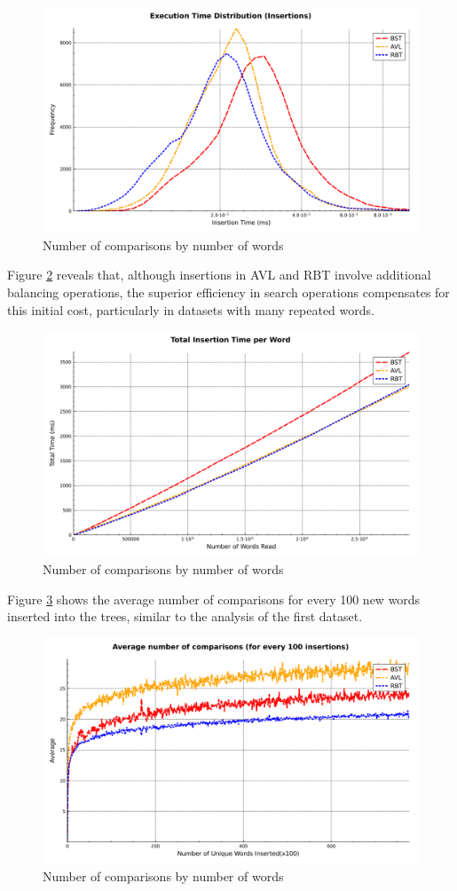  \begin{figure}[H]
     \centering
     \includegraphics[width=0.8\linewidth]{img/Graph_5_77770.pdf}
     \caption{Number of comparisons by number of words}
     \label{fig:timedist2}
 \end{figure}

 Figure \ref{fig:cumulativedist2} reveals that, although insertions in AVL and RBT
 involve additional balancing operations, the superior efficiency in search operations
 compensates for this initial cost, particularly in datasets with many repeated words.

 \begin{figure}[H]
     \centering
     \includegraphics[width=0.8\linewidth]{img/Graph_4_77770.pdf}
     \caption{Number of comparisons by number of words}
     \label{fig:cumulativedist2}
 \end{figure}
Figure \ref{fig:mean-log2} shows the average number of comparisons for every 100 new words 
inserted into the trees, similar to the analysis of the first dataset.
\begin{figure}[H]
     \centering
     \includegraphics[width=0.8\linewidth]{img/Graph_3_77770.pdf}
     \caption{Number of comparisons by number of words}
     \label{fig:mean-log2}
\end{figure}

